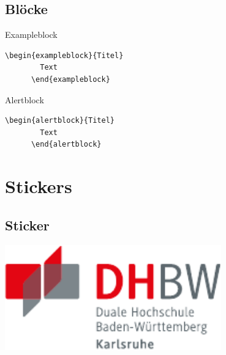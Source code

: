 \subsection{Blöcke}
\begin{frame}[fragile]{\subsecname}

  \begin{exampleblock}{Exampleblock}
    \begin{lstlisting}[gobble=6]
      \begin{exampleblock}{Titel}
        Text
      \end{exampleblock}
    \end{lstlisting}
  \end{exampleblock}

  \begin{alertblock}{Alertblock}
    \begin{lstlisting}[gobble=6]
      \begin{alertblock}{Titel}
        Text
      \end{alertblock}
    \end{lstlisting}
  \end{alertblock}

\end{frame}

\section{Stickers}

\subsection{Sticker}
\begin{frame}{\subsecname}

  \begin{sticker}[+1]
    \includegraphics[width=0.7\textwidth]{DHBW.pdf}
  \end{sticker}

\end{frame}

